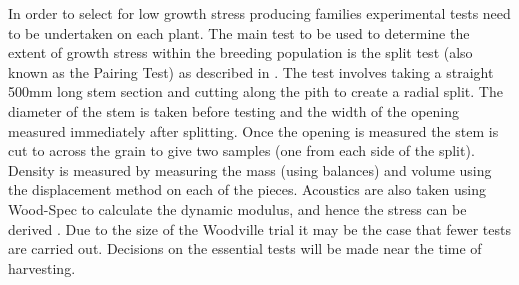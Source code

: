 In order to select for low growth stress producing families experimental tests
need to be undertaken on each plant. The main test to be used to determine the
extent of growth stress within the breeding population is the split test (also
known as the Pairing Test) as described in \cite{Chauhan_2010}. The test involves
taking a straight 500mm long stem section and cutting along the pith to create
a radial split. The diameter of the stem is taken before testing and the width
of the opening measured immediately after splitting. Once the opening is
measured the stem is cut to across the grain to give two samples (one from each
side of the split). Density is measured by measuring the mass (using balances)
and volume using the displacement method on each of the pieces. Acoustics are
also taken using Wood-Spec to calculate the dynamic modulus, and hence the
stress can be derived \cite{Chauhan_2010}. Due to the size of the Woodville trial it
may be the case that fewer tests are carried out. Decisions on the essential
tests will be made near the time of harvesting. 